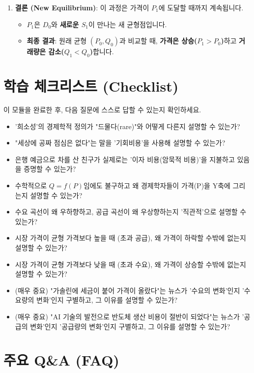 \documentclass[11pt,a4paper]{book}
\theoremstyle{definition}
\begin{document}
\begin{enumerate}
    \item \textbf{결론 (New Equilibrium)}: 이 과정은 가격이 $P_1$에 도달할 때까지 계속됩니다.
        \begin{itemize}
            \item $P_1$은 $D_0$와 \textbf{새로운 $S_1$}이 만나는 새 균형점입니다.
            \item \textbf{최종 결과}: 원래 균형 $(P_0, Q_0)$과 비교할 때, \textbf{가격은 상승($P_1 > P_0$)}하고 \textbf{거래량은 감소($Q_1 < Q_0$)}합니다.
        \end{itemize}
\end{enumerate}


\section{학습 체크리스트 (Checklist)}

이 모듈을 완료한 후, 다음 질문에 스스로 답할 수 있는지 확인하세요.

\begin{itemize}
    \item [ ] '희소성'의 경제학적 정의가 "드물다(rare)"와 어떻게 다른지 설명할 수 있는가?
    \item [ ] "세상에 공짜 점심은 없다"는 말을 '기회비용'을 사용해 설명할 수 있는가?
    \item [ ] 은행 예금으로 차를 산 친구가 실제로는 '이자 비용(암묵적 비용)'을 지불하고 있음을 증명할 수 있는가?
    \item [ ] 수학적으로 $Q=f(P)$임에도 불구하고 왜 경제학자들이 가격(P)을 Y축에 그리는지 설명할 수 있는가?
    \item [ ] 수요 곡선이 왜 우하향하고, 공급 곡선이 왜 우상향하는지 '직관적'으로 설명할 수 있는가?
    \item [ ] 시장 가격이 균형 가격보다 높을 때 (초과 공급), 왜 가격이 하락할 수밖에 없는지 설명할 수 있는가?
    \item [ ] 시장 가격이 균형 가격보다 낮을 때 (초과 수요), 왜 가격이 상승할 수밖에 없는지 설명할 수 있는가?
    \item [ ] (매우 중요) "가솔린에 세금이 붙어 가격이 올랐다"는 뉴스가 '수요의 변화'인지 '수요량의 변화'인지 구별하고, 그 이유를 설명할 수 있는가?
    \item [ ] (매우 중요) "AI 기술의 발전으로 반도체 생산 비용이 절반이 되었다"는 뉴스가 '공급의 변화'인지 '공급량의 변화'인지 구별하고, 그 이유를 설명할 수 있는가?
\end{itemize}

\section{주요 Q\&A (FAQ)}
\end{document}
